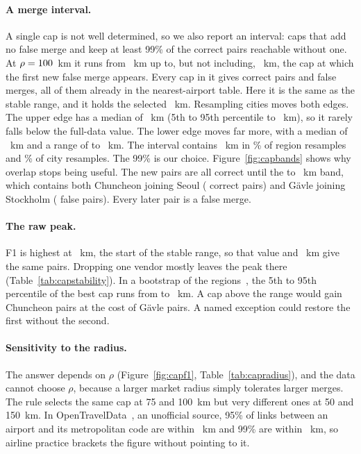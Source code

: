 \documentclass[10pt,twocolumn]{article}
\begin{document}
\paragraph{A merge interval.} A single cap is not well determined, so we also report an interval: caps that add no false merge and keep at least 99\% of the correct pairs reachable without one. At $\rho=100$~km it runs from \capIntervalLow{}~km up to, but not including, \capIntervalHigh{}~km, the cap at which the first new false merge appears. Every cap in it gives \capIntervalPairs{} correct pairs and \capIntervalFalse{} false merges, all of them already in the nearest-airport table. Here it is the same as the stable range, and it holds the selected \capSelected{}~km. Resampling cities moves both edges. The upper edge has a median of \capCityUpperMedian{}~km (5th to 95th percentile \capCityUpperLow{} to \capCityUpperHigh{}~km), so it rarely falls below the full-data value. The lower edge moves far more, with a median of \capCityLowerMedian{}~km and a range of \capCityLowerLow{} to \capCityLowerHigh{}~km. The interval contains \capSelected{}~km in \capRegionHolds{}\% of region resamples and \capCityHolds{}\% of city resamples. The 99\% is our choice. Figure~\ref{fig:capbands} shows why overlap stops being useful. The new pairs are all correct until the \capMixedLow{} to \capMixedHigh{}~km band, which contains both Chuncheon joining Seoul (\capMixedGood{} correct pairs) and G\"avle joining Stockholm (\capMixedBad{} false pairs). Every later pair is a false merge.

\paragraph{The raw peak.} F1 is highest at \capPeak{}~km, the start of the stable range, so that value and \capUsed{}~km give the same pairs. Dropping one vendor mostly leaves the peak there (Table~\ref{tab:capstability}). In a bootstrap of the regions~\citep{efron1979bootstrap}, the 5th to 95th percentile of the best cap runs from \capBootLow{} to \capBootHigh{}~km. A cap above the range would gain \capMixedGood{} Chuncheon pairs at the cost of \capMixedBad{} G\"avle pairs. A named exception could restore the first without the second.

\paragraph{Sensitivity to the radius.} The answer depends on $\rho$ (Figure~\ref{fig:capf1}, Table~\ref{tab:capradius}), and the data cannot choose $\rho$, because a larger market radius simply tolerates larger merges. The rule selects the same cap at 75 and 100~km but very different ones at 50 and 150~km. In OpenTravelData~\citep{opentraveldata}, an unofficial source, 95\% of \metroLinks{} links between an airport and its metropolitan code are within \metroNinetyFive{}~km and 99\% are within \metroNinetyNine{}~km, so airline practice brackets the figure without pointing to it.
\end{document}
